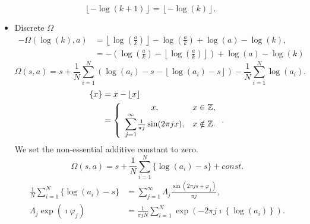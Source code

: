 \documentclass[titlepage,fleqn]{article}%
\providecommand{\U}[1]{\protect\rule{.1in}{.1in}}
\begin{document}
\[
\left\lfloor -\log\left(  k+1\right)  \right\rfloor =\left\lfloor -\log\left(
k\right)  \right\rfloor .
\]


\begin{itemize}
\item Discrete $\Omega$%
\begin{align*}
-\Omega(\log(k),a)  &  =\left\lfloor \log\left(  \frac{a}{k}\right)
\right\rfloor -\log\left(  \frac{a}{k}\right)  +\log\left(  a\right)
-\log\left(  k\right)  ,\\
&  =-\left(  \log\left(  \frac{a}{k}\right)  -\left\lfloor \log\left(
\frac{a}{k}\right)  \right\rfloor \right)  +\log\left(  a\right)  -\log\left(
k\right)
\end{align*}%
\[
\Omega(s,a)=s+\frac{1}{N}%
{\displaystyle\sum\limits_{i=1}^{N}}
\left(  \log\left(  a_{i}\right)  -s-\left\lfloor \log\left(  a_{i}\right)
-s\right\rfloor \right)  -\frac{1}{N}%
{\displaystyle\sum\limits_{i=1}^{N}}
\log\left(  a_{i}\right)  .
\]%
\begin{align*}
\{x\}  &  =x-\left\lfloor x\right\rfloor \\
&  =\left\{
\begin{array}
[c]{cc}%
x, & x\in%
\mathbb{Z}
,\\%
{\displaystyle\sum\limits_{j=1}^{\infty}}
\frac{1}{\pi j}\sin(2\pi jx), & x\notin%
\mathbb{Z}
.
\end{array}
\right.  .
\end{align*}
We set the non-essential additive constant to zero.%
\[
\Omega(s,a)=s+\frac{1}{N}%
{\displaystyle\sum\limits_{i=1}^{N}}
\{\log\left(  a_{i}\right)  -s\}+const.
\]%
\begin{align*}
\frac{1}{N}%
{\displaystyle\sum\limits_{i=1}^{N}}
\{\log\left(  a_{i}\right)  -s\}  &  =%
{\displaystyle\sum\limits_{j=1}^{\infty}}
\Lambda_{j}\frac{\sin(2\pi js+\varphi_{j})}{\pi j},\\
\Lambda_{j}\exp(\imath\varphi_{j})  &  =\frac{1}{\pi jN}%
{\displaystyle\sum\limits_{i=1}^{N}}
\exp(-2\pi j\imath\left\{  \log\left(  a_{i}\right)  \right\}  ).
\end{align*}



\end{itemize}
\end{document}
